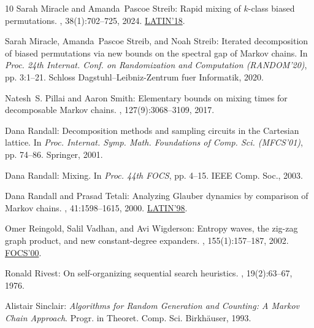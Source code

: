 \begin{thebibliography}{10}
{\sc Sarah Miracle and Amanda~Pascoe Streib}: Rapid mixing of $k$-class biased
  permutations.
, 38(1):702--725, 2024.
\newblock \prelim
  \href{https://doi.org/10.1007/978-3-319-77404-6\_59}{LATIN'18}.
\newblock [\epfmtdoi{10.1137/22M148063X}]

{\sc Sarah Miracle, Amanda~Pascoe Streib, and Noah Streib}: Iterated
  decomposition of biased permutations via new bounds on the spectral gap of
  {M}arkov chains.
\newblock In {\em Proc. 24th Internat. Conf. on Randomization and Computation
  (RANDOM'20)}, pp. 3:1--21. Schloss Dagstuhl--Leibniz-Zentrum fuer Informatik,
  2020.

{\sc Natesh~S. Pillai and Aaron Smith}: Elementary bounds on mixing times for
  decomposable {M}arkov chains.
, 127(9):3068--3109, 2017.

{\sc Dana Randall}: Decomposition methods and sampling circuits in the
  {C}artesian lattice.
\newblock In {\em Proc. Internat. Symp. Math. Foundations of Comp. Sci.
  (MFCS'01)}, pp. 74--86. Springer, 2001.
\newblock [\epfmtdoi{10.1007/3-540-44683-4\_8}]

{\sc Dana Randall}: Mixing.
\newblock In {\em Proc. 44th FOCS}, pp. 4--15. IEEE Comp. Soc., 2003.

{\sc Dana Randall and Prasad Tetali}: Analyzing {G}lauber dynamics by
  comparison of {M}arkov chains.
, 41:1598--1615, 2000.
\newblock \prelim \href{https://doi.org/10.1007/BFb0054330}{LATIN'98}.
\newblock [\epfmtdoi{10.1063/1.533199}]

{\sc Omer Reingold, Salil Vadhan, and Avi Wigderson}: Entropy waves, the
  zig-zag graph product, and new constant-degree expanders.
, 155(1):157--187, 2002.
\newblock \prelim \href{https://doi.org/10.1109/SFCS.2000.892006}{FOCS'00}.
\newblock [\epfmtdoi{10.2307/3062153}]

{\sc Ronald Rivest}: On self-organizing sequential search heuristics.
, 19(2):63--67, 1976.
\newblock [\epfmtdoi{10.1145/359997.360000}]

{\sc Alistair Sinclair}: {\em Algorithms for Random Generation and Counting:
  {A} {M}arkov Chain Approach}.
\newblock Progr. in Theoret. Comp. Sci. Birkh\"{a}user, 1993.
\newblock [\epfmtdoi{10.1007/978-1-4612-0323-0}]


\end{thebibliography}

